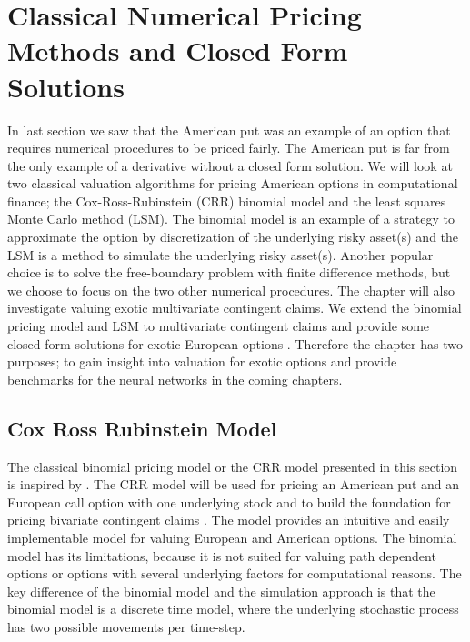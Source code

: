 \chapter{Classical Numerical Pricing Methods and Closed Form Solutions} %

\label{Chapter3} %

In last section we saw that the American put was an example of an option that requires numerical procedures to be priced fairly. The American put is far from the only example of a derivative without a closed form solution. We will look at two classical valuation algorithms for pricing American options in computational finance; the Cox-Ross-Rubinstein (CRR) binomial model and the least squares Monte Carlo method (LSM). The binomial model is an example of a strategy to approximate the option by discretization of the underlying risky asset(s) and the LSM is a method to simulate the underlying risky asset(s). Another popular choice is to solve the free-boundary problem with finite difference methods, but we choose to focus on the two other numerical procedures. The chapter will also investigate valuing exotic multivariate contingent claims. We extend the binomial pricing model \parencite{NEK,BEG} and LSM to multivariate contingent claims and provide some closed form solutions for exotic European options \parencite{Johnson87, Ouwehand2006}. Therefore the chapter has two purposes; to gain insight into valuation for exotic options and provide benchmarks for the neural networks in the coming chapters.

\section{Cox Ross Rubinstein Model}\label{CRR}
The classical binomial pricing model or the CRR model presented in this section is inspired by \parencite{CRR,Hull,finKont}. The CRR model will be used for pricing an American put and an European call option with one underlying stock and to build the foundation for pricing bivariate contingent claims \parencite{BEG}. The model provides an intuitive and easily implementable model for valuing European and American options. The binomial model has its limitations, because it is not suited for valuing path dependent options or options with several underlying factors for computational reasons. The key difference of the binomial model and the simulation approach is that the binomial model is a discrete time model, where the underlying stochastic process has two possible movements per time-step. \\

